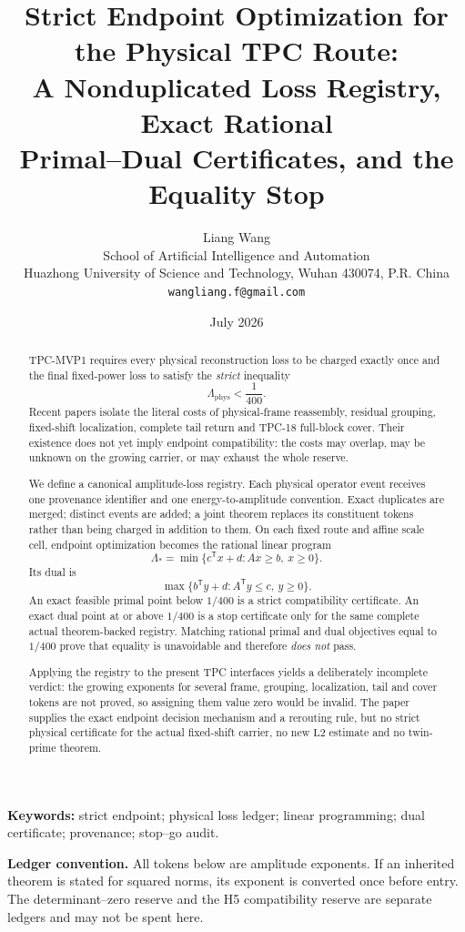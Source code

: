\documentclass[11pt]{article}
\title{\textbf{Strict Endpoint Optimization for the Physical TPC Route:}\\
A Nonduplicated Loss Registry, Exact Rational\\
Primal--Dual Certificates, and the Equality Stop}
\author{Liang Wang\\
School of Artificial Intelligence and Automation\\
Huazhong University of Science and Technology, Wuhan 430074, P.R. China\\
\texttt{wangliang.f@gmail.com}}
\date{July 2026}
\theoremstyle{definition}
\theoremstyle{remark}
\newcommand{\Ltwo}{\mathrm{L2}}
\begin{document}
\maketitle

\begin{abstract}
TPC-MVP1 requires every physical reconstruction loss to be charged
exactly once and the final fixed-power loss to satisfy the
\emph{strict} inequality
\[
 \Lambda_{\mathrm{phys}}<\frac1{400}.
\]
Recent papers isolate the literal costs of physical-frame
reassembly, residual grouping, fixed-shift localization, complete
tail return and TPC-18 full-block cover.  Their existence does not
yet imply endpoint compatibility: the costs may overlap, may be
unknown on the growing carrier, or may exhaust the whole reserve.

We define a canonical amplitude-loss registry.  Each physical
operator event receives one provenance identifier and one
energy-to-amplitude convention.  Exact duplicates are merged;
distinct events are added; a joint theorem replaces its constituent
tokens rather than being charged in addition to them.  On each
fixed route and affine scale cell, endpoint optimization becomes the
rational linear program
\[
 \Lambda_*=\min\{c^\mathsf Tx+d:
                 Ax\ge b,\ x\ge0\}.
\]
Its dual is
\[
 \max\{b^\mathsf Ty+d:
       A^\mathsf Ty\le c,\ y\ge0\}.
\]
An exact feasible primal point below \(1/400\) is a strict
compatibility certificate.  An exact dual point at or above
\(1/400\) is a stop certificate only for the same complete actual
theorem-backed registry.  Matching rational
primal and dual objectives equal to \(1/400\) prove that equality is
unavoidable and therefore \emph{does not} pass.

Applying the registry to the present TPC interfaces yields a
deliberately incomplete verdict: the growing exponents for several
frame, grouping, localization, tail and cover tokens are not proved,
so assigning them value zero would be invalid.  The paper supplies
the exact endpoint decision mechanism and a rerouting rule, but no
strict physical certificate for the actual fixed-shift carrier, no
new \(\Ltwo\) estimate and no twin-prime theorem.
\end{abstract}

\noindent\textbf{Keywords:}
strict endpoint; physical loss ledger; linear programming; dual
certificate; provenance; stop--go audit.

\medskip
\noindent\textbf{Ledger convention.}
All tokens below are amplitude exponents.  If an inherited theorem
is stated for squared norms, its exponent is converted once before
entry.  The determinant--zero reserve and the H5 compatibility
reserve are separate ledgers and may not be spent here.
\end{document}
